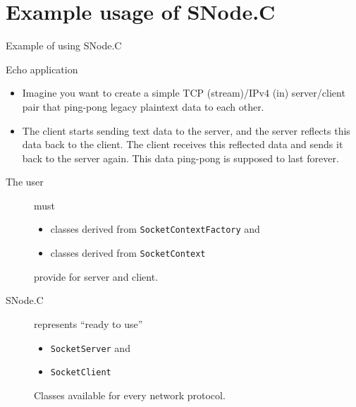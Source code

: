 ﻿\section{Example usage of SNode.C}

\begin{frame}{Example of using SNode.C}
   \begin{block}{Echo application}
   \begin{itemize}
   \item Imagine you want to create a simple TCP (stream)/IPv4 (in) server/client pair that ping-pong legacy plaintext data to each other.
   \item The client starts sending text data to the server, and the server reflects this data back to the client. The client receives this reflected data and sends it back to the server again. This data ping-pong is supposed to last forever.
   \end{itemize}
\end{block}
   \begin{description}
     \item [The user] must
     \begin{itemize}
       \item classes derived from \texttt{SocketContextFactory} and
       \item classes derived from \texttt{SocketContext}
     \end{itemize}
     provide for server and client.
     \item [SNode.C] represents "`ready to use"'
     \begin{itemize}
       \item \texttt{SocketServer} and
       \item \texttt{SocketClient}
     \end{itemize}
     Classes available for every network protocol.
   \end{description}
\end{frame}